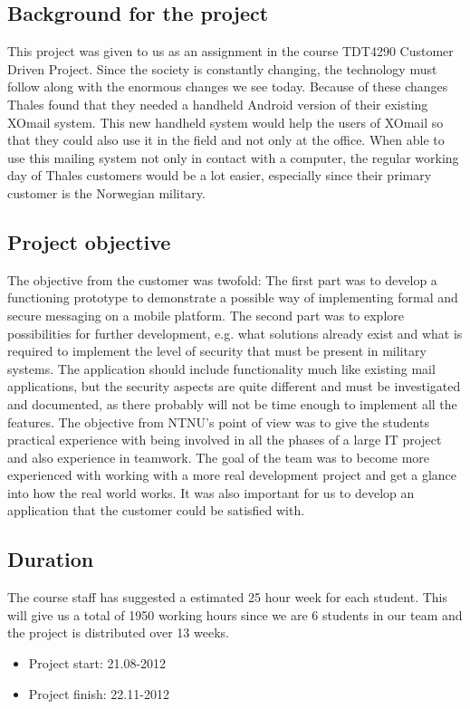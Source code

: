 \subsection{Background for the project}
This project was given to us as an assignment in the course TDT4290 Customer Driven Project. Since the society is constantly changing, the technology must follow along with the enormous changes we see today. Because of these changes Thales found that they needed a handheld Android version of their existing XOmail system. This new handheld system would help the users of XOmail so that they could also use it in the field and not only at the office. When able to use this mailing system not only in contact with a computer, the regular working day of Thales customers would be a lot easier, especially since their primary customer is the Norwegian military.

\subsection{Project objective}
The objective from the customer was twofold: The first part was to develop a functioning prototype to demonstrate a possible way of implementing formal and secure messaging on a mobile platform. The second part was to explore possibilities for further development, e.g. what solutions already exist and what is required to implement the level of security that must be present in military systems. The application should include functionality much like existing mail applications, but the security aspects are quite different and must be investigated and documented, as there probably will not be time enough to implement all the features.
\newline
\newline
The objective from NTNU’s point of view was to give the students practical experience with being involved in all the phases of a large IT project and also experience in teamwork. 
\newline
\newline
The goal of the team was to become more experienced with working with a more real development project and get a glance into how the real world works. It was also important for us to develop an application that the customer could be satisfied with. 


\subsection{Duration}
The course staff has suggested a estimated 25 hour week for each student. This will give us a total of 1950 working hours since we are 6 students in our team and the project is distributed over 13 weeks.

\begin{itemize}
\item{}Project start: 21.08-2012
\item{}Project finish: 22.11-2012
\end{itemize}

